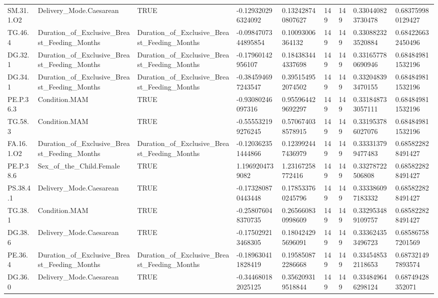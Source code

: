\begin{longtable}{lllllllll}
SM.31.1.O2 & Delivery\_Mode.Caesarean & TRUE & -0.129320296324092 & 0.132428740807627 & 149 & 149 & 0.330440823730478 & 0.683759980129427 \\
TG.46.4 & Duration\_of\_Exclusive\_Breast\_Feeding\_Months & Duration\_of\_Exclusive\_Breast\_Feeding\_Months & -0.0984707344895854 & 0.10093006364132 & 149 & 149 & 0.330882323520884 & 0.684226632450496 \\
DG.32.1 & Duration\_of\_Exclusive\_Breast\_Feeding\_Months & Duration\_of\_Exclusive\_Breast\_Feeding\_Months & -0.17960142956107 & 0.184383444337698 & 149 & 149 & 0.331657780690946 & 0.684849811532196 \\
DG.34.1 & Duration\_of\_Exclusive\_Breast\_Feeding\_Months & Duration\_of\_Exclusive\_Breast\_Feeding\_Months & -0.384594697243547 & 0.395154952074502 & 149 & 149 & 0.332048393470155 & 0.684849811532196 \\
PE.P.36.3 & Condition.MAM & TRUE & -0.93080246097316 & 0.955964429692297 & 149 & 149 & 0.331848733057111 & 0.684849811532196 \\
TG.58.3 & Condition.MAM & TRUE & -0.555532199276245 & 0.570674038578915 & 149 & 149 & 0.331953786027076 & 0.684849811532196 \\
FA.16.1.O2 & Duration\_of\_Exclusive\_Breast\_Feeding\_Months & Duration\_of\_Exclusive\_Breast\_Feeding\_Months & -0.120362351444866 & 0.123992447436979 & 149 & 149 & 0.333313799477483 & 0.685822828491427 \\
PE.P.38.6 & Sex\_of\_the\_Child.Female & TRUE & 1.1969204739082 & 1.23167258772416 & 149 & 149 & 0.33278722506808 & 0.685822828491427 \\
PS.38.4.1 & Delivery\_Mode.Caesarean & TRUE & -0.173280870443448 & 0.178533760245796 & 149 & 149 & 0.333386097183332 & 0.685822828491427 \\
TG.38.1 & Condition.MAM & TRUE & -0.258076048370735 & 0.265660830998609 & 149 & 149 & 0.332953489109757 & 0.685822828491427 \\
DG.38.6 & Delivery\_Mode.Caesarean & TRUE & -0.175029213468305 & 0.180424295696091 & 149 & 149 & 0.333624353496723 & 0.685867587201569 \\
PE.36.4 & Duration\_of\_Exclusive\_Breast\_Feeding\_Months & Duration\_of\_Exclusive\_Breast\_Feeding\_Months & -0.189630411828419 & 0.195850872286668 & 149 & 149 & 0.334548532118653 & 0.687321497893574 \\
DG.36.0 & Delivery\_Mode.Caesarean & TRUE & -0.344680182025125 & 0.356209319518844 & 149 & 149 & 0.334849646298124 & 0.68749428352071 \\

\end{longtable}
